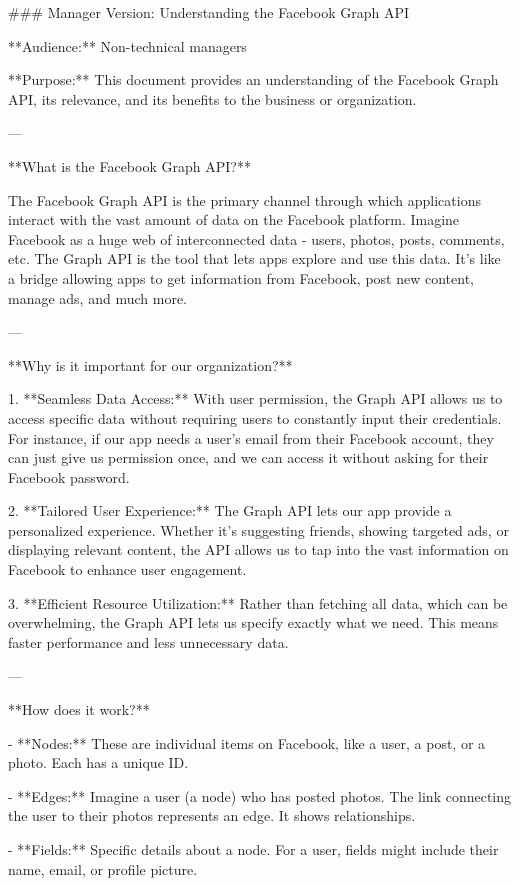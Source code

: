 ### Manager Version: Understanding the Facebook Graph API

**Audience:** Non-technical managers

**Purpose:** This document provides an understanding of the Facebook Graph API, its relevance, and its benefits to the business or organization.

---

**What is the Facebook Graph API?**

The Facebook Graph API is the primary channel through which applications interact with the vast amount of data on the Facebook platform. Imagine Facebook as a huge web of interconnected data - users, photos, posts, comments, etc. The Graph API is the tool that lets apps explore and use this data. It's like a bridge allowing apps to get information from Facebook, post new content, manage ads, and much more.

---

**Why is it important for our organization?**

1. **Seamless Data Access:** With user permission, the Graph API allows us to access specific data without requiring users to constantly input their credentials. For instance, if our app needs a user's email from their Facebook account, they can just give us permission once, and we can access it without asking for their Facebook password.

2. **Tailored User Experience:** The Graph API lets our app provide a personalized experience. Whether it's suggesting friends, showing targeted ads, or displaying relevant content, the API allows us to tap into the vast information on Facebook to enhance user engagement.

3. **Efficient Resource Utilization:** Rather than fetching all data, which can be overwhelming, the Graph API lets us specify exactly what we need. This means faster performance and less unnecessary data.

---

**How does it work?**

- **Nodes:** These are individual items on Facebook, like a user, a post, or a photo. Each has a unique ID.

- **Edges:** Imagine a user (a node) who has posted photos. The link connecting the user to their photos represents an edge. It shows relationships.

- **Fields:** Specific details about a node. For a user, fields might include their name, email, or profile picture.

